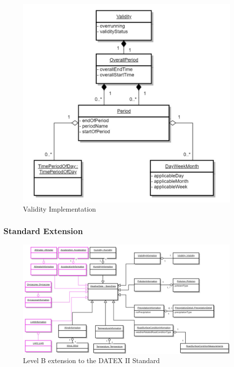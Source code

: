 \begin{figure}
	\begin{center}
		\includegraphics[width=0.6\columnwidth]{images/uml_4_37}
	\end{center}
	\caption{Validity Implementation}
	\label{fig:app_uml_4_37}
\end{figure}
\subsubsection{Standard Extension}
\begin{figure}
	\begin{center}
		\includegraphics[width=1\columnwidth]{images/uml_4_28_extended}
	\end{center}
	\caption{Level B extension to the DATEX II Standard}
	\label{fig:app_uml_4_28_extended}
\end{figure}

